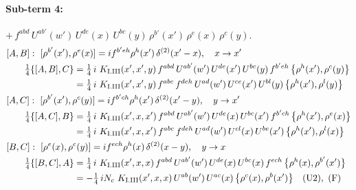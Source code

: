 \documentclass[10pt]{article}
\numberwithin{equation}{section}
\begin{document}
\paragraph{Sub-term 4:} $+\,f^{abd}\,U^{ab'}(w')\,U^{de}(x)\,U^{bc}(y)\,\rho^{b'}(x')\,\rho^{e}(x)\,\rho^{c}(y)$.
\begin{align}
&[A,B]:\ [\rho^{b'}(x'),\rho^{e}(x)]=i f^{b'eh}\rho^{h}(x')\,\delta^{(2)}(x'-x),\quad x\to x'\notag\\
&\qquad \tfrac14\{[A,B],C\}=\tfrac14\,i\,\,K_{\rm I.III}(x',x',y)\,f^{abd}\,U^{ab'}(w')\,U^{de}(x')\,U^{bc}(y)\,f^{b'eh}\,\big\{\rho^{h}(x'),\rho^{c}(y)\big\}\notag\\
&\qquad\phantom{\tfrac14\{[A,B],C\}}=\tfrac14\,i\,\,K_{\rm I.III}(x',x',y)\,f^{abc}\,f^{deh}\,U^{ad}(w')\,U^{ce}(x')\,U^{bl}(y)\,\big\{\rho^{h}(x'),\rho^{l}(y)\big\}
\label{R:eq:GI.III-4-AB}\\
&[A,C]:\ [\rho^{b'}(x'),\rho^{c}(y)]=i f^{b'ch}\rho^{h}(x')\,\delta^{(2)}(x'-y),\quad y\to x'\notag\\
&\qquad \tfrac14\{[A,C],B\}=\tfrac14\,i\,\,K_{\rm I.III}(x',x,x')\,f^{abd}\,U^{ab'}(w')\,U^{de}(x)\,U^{bc}(x')\,f^{b'ch}\,\big\{\rho^{h}(x'),\rho^{e}(x)\big\}\notag\\
&\qquad\phantom{\tfrac14\{[A,C],B\}}=\tfrac14\,i\,\,K_{\rm I.III}(x',x,x')\,f^{abc}\,f^{deh}\,U^{ad}(w')\,U^{cl}(x)\,U^{be}(x')\,\big\{\rho^{h}(x'),\rho^{l}(x)\big\}
\label{R:eq:GI.III-4-AC}\\
&[B,C]:\ [\rho^{e}(x),\rho^{c}(y)]=i f^{ech}\rho^{h}(x)\,\delta^{(2)}(x-y),\quad y\to x\notag\\
&\qquad \tfrac14\{[B,C],A\}=\tfrac14\,i\,\,K_{\rm I.III}(x',x,x)\,f^{abd}\,U^{ab'}(w')\,U^{de}(x)\,U^{bc}(x)\,f^{ech}\,\big\{\rho^{h}(x),\rho^{b'}(x')\big\}\notag\\
&\qquad\phantom{\tfrac14\{[B,C],A\}}=-\tfrac14\,i N_{c}\,\,K_{\rm I.III}(x',x,x)\,U^{ab}(w')\,U^{ac}(x)\,\big\{\rho^{c}(x),\rho^{b}(x')\big\}\quad\text{(U2)},\ \text{(F)}
\label{R:eq:GI.III-4-BC}
\end{align}
\end{document}
